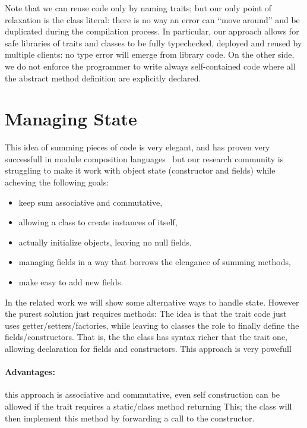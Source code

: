 Note that we can reuse code only by naming traits; but our only point of relaxation is the class literal: there is no way an error can ``move around'' and be duplicated during the compilation process.
In particular, our approach allows for safe libraries of traits and classes to be fully typechecked, deployed and reused by multiple clients: no type error will emerge from library code.
On the other side, we do not enforce the programmer to write always self-contained code where all the abstract method definition are explicitly declared.

\section{Managing State}
This idea of summing pieces of code is very elegant,
and has proven very successfull in module composition languages~\cite{ancona2002calculus} but our research community is struggling to
make it work with object state (constructor and fields) while acheving the following goals:

\begin{itemize}
\item keep sum associative and commutative,
\item allowing a class to create instances of itself,
\item actually initialize objects, leaving no null fields,
\item managing fields in a way that borrows the elengance of summing methods,
\item make easy to add new fields.
\end{itemize}

In the related work we will show some alternative ways to handle state.
However the purest solution just requires methods:
  The idea is that
  the trait code just uses getter/setters/factories, while leaving
  to classes the role to finally define the fields/constructors.
  That is, the  the class has syntax richer that the trait one,
  allowing declaration for fields and constructors.
  This approach is very powefull~\cite{wang2016classless}
 
\paragraph*{Advantages:} 
this approach is associative and commutative, even self construction
  can be allowed if the trait requires a static/class method
  returning This; the class will then implement this method by forwarding
  a call to the constructor.
  
